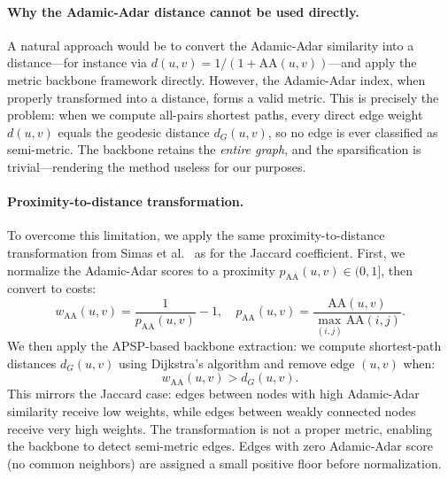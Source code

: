 \documentclass[conference]{IEEEtran}
\begin{document}
\paragraph{Why the Adamic-Adar distance cannot be used directly.} A natural approach would be to convert the Adamic-Adar similarity into a distance---for instance via $d(u,v) = 1/(1 + \text{AA}(u,v))$---and apply the metric backbone framework directly. However, the Adamic-Adar index, when properly transformed into a distance, forms a valid metric. This is precisely the problem: when we compute all-pairs shortest paths, every direct edge weight $d(u,v)$ equals the geodesic distance $d_G(u,v)$, so no edge is ever classified as semi-metric. The backbone retains the \emph{entire graph}, and the sparsification is trivial---rendering the method useless for our purposes.

\paragraph{Proximity-to-distance transformation.} To overcome this limitation, we apply the same proximity-to-distance transformation from Simas et al.~\cite{simas2021} as for the Jaccard coefficient. First, we normalize the Adamic-Adar scores to a proximity $p_{\text{AA}}(u,v) \in (0, 1]$, then convert to costs:
\begin{equation}
    w_{\text{AA}}(u, v) = \frac{1}{p_{\text{AA}}(u, v)} - 1, \quad p_{\text{AA}}(u,v) = \frac{\text{AA}(u,v)}{\max_{(i,j)} \text{AA}(i,j)}.
    \label{eq:aa_weight}
\end{equation}
We then apply the APSP-based backbone extraction: we compute shortest-path distances $d_G(u,v)$ using Dijkstra's algorithm and remove edge $(u,v)$ when:
\begin{equation}
    w_{\text{AA}}(u, v) > d_G(u, v).
    \label{eq:aa_violation}
\end{equation}
This mirrors the Jaccard case: edges between nodes with high Adamic-Adar similarity receive low weights, while edges between weakly connected nodes receive very high weights. The transformation is not a proper metric, enabling the backbone to detect semi-metric edges. Edges with zero Adamic-Adar score (no common neighbors) are assigned a small positive floor before normalization.
\end{document}
